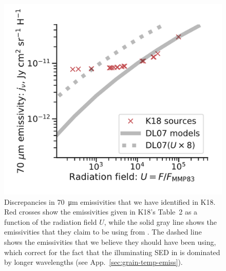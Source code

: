 

\begin{figure}
  \centering
  \includegraphics[width=\linewidth]{figs/K18-emissivity-vs-U}
  \caption{Discrepancies in \SI{70}{\um} emissivities that we have
    identified in K18.  Red crosses show the emissivities given in
    K18's Table~2 as a function of the radiation field \(U\), while
    the solid gray line shows the emissivities that they claim to be
    using from \citet{Draine:2007a}.  The dashed line shows the
    emissivities that we believe they should have been using, which
    correct for the fact that the illuminating SED in
    \citet{Draine:2007a} is dominated by longer wavelengths (see
    App.~\ref{sec:grain-temp-emiss}).}
  \label{fig:k18-emissivity}
\end{figure}

